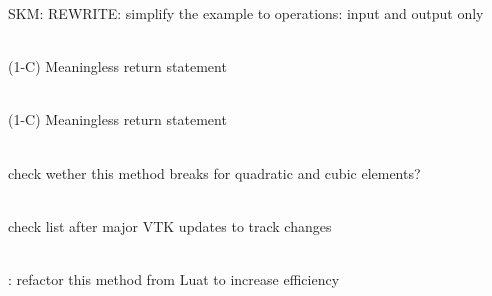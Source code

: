 \begin{DoxyRefList}
\label{todo__todo000042}%
%
SKM\+: REWRITE\+: simplify the example to  operations\+: input and output only 
\item[Member \doxylink{structcsmp_1_1_parameter_a69b7de5e6144dd88c2ece04c3635496c}{csmp\+::Parameter\+::In} (std\+::fstream \&fp)]\hfill \\
\label{todo__todo000177}%
%
(1-\/C) Meaningless return statement  
\item[Member \doxylink{structcsmp_1_1_parameter_ab3899525b130cb7d333fcc8e8a91cf8a}{csmp\+::Parameter\+::Out} (std\+::fstream \&fp) const]\hfill \\
\label{todo__todo000176}%
%
(1-\/C) Meaningless return statement  
\item[Member \doxylink{namespacecsmp_a570de91cab1ea7842d54240d63777a1f}{csmp\+::parent\+Elements\+Sharing\+Multiple\+Edge\+Nodes} (const vector\texorpdfstring{$<$}{<} \doxylink{classcsmp_1_1_node}{Node$<$ 3\+U $>$} \texorpdfstring{$\ast$}{*} \texorpdfstring{$>$}{>} \&edge\+\_\+nodes, map\texorpdfstring{$<$}{<} \doxylink{classcsmp_1_1_element}{Element$<$ 3 $>$} \texorpdfstring{$\ast$}{*}, vector\texorpdfstring{$<$}{<} \doxylink{classcsmp_1_1_node}{Node$<$ 3 $>$} \texorpdfstring{$\ast$}{*} \texorpdfstring{$>$}{>} \texorpdfstring{$>$}{>} \&segm\+\_\+parents, bool find\+\_\+segment\+\_\+ids)]\hfill \\
\label{todo__todo000160}%
%
check wether this method breaks for quadratic and cubic elements?  
\item[Member \doxylink{namespacecsmp_a0d17c2215c8ac2f43df3dfdae7bcb272}{csmp\+::parse\+Element\+Type} (\doxylink{group___c_s_m_pglobal_enums_ga182d1fe97a0151d464d8170c0fafa872}{CSMP\+\_\+\+FEM\+\_\+\+TYPE})]\hfill \\
\label{todo__todo000130}%
%
check list after major VTK updates to track changes 
\item[Member \doxylink{classcsmp_1_1_p_d_e___integrator_aaeb7ef545d71d1af82b9f64678556156}{csmp\+::PDE\+\_\+\+Integrator\texorpdfstring{$<$}{<} dim, CELLTYPE \texorpdfstring{$>$}{>}\+::Couple\+Domains\+Across\+Split\+Boundary} (\doxylink{classcsmp_1_1_model_sub_domain}{Model\+Sub\+Domain$<$ dim, CELLTYPE $>$} \&)]\hfill \\
\label{todo__todo000021}%
%
\+: refactor this method from Luat to increase efficiency 


\end{DoxyRefList}
